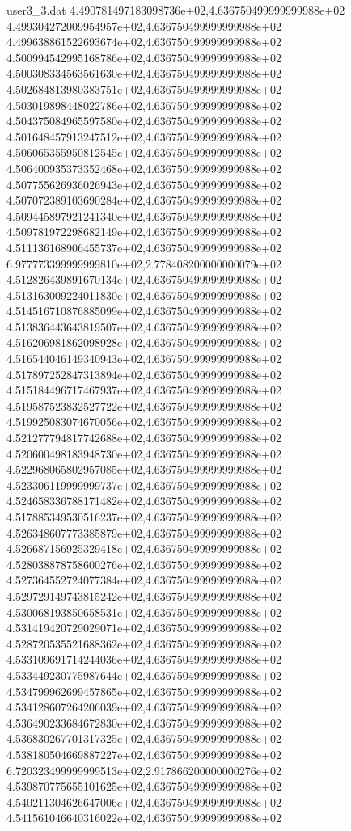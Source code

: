 \begin{filecontents}{user3_3.dat}
4.490781497183098736e+02,4.636750499999999988e+02
4.499304272009954957e+02,4.636750499999999988e+02
4.499638861522693674e+02,4.636750499999999988e+02
4.500994542995168786e+02,4.636750499999999988e+02
4.500308334563561630e+02,4.636750499999999988e+02
4.502684813980383751e+02,4.636750499999999988e+02
4.503019898448022786e+02,4.636750499999999988e+02
4.504375084965597580e+02,4.636750499999999988e+02
4.501648457913247512e+02,4.636750499999999988e+02
4.506065355950812545e+02,4.636750499999999988e+02
4.506400935373352468e+02,4.636750499999999988e+02
4.507755626936026943e+02,4.636750499999999988e+02
4.507072389103690284e+02,4.636750499999999988e+02
4.509445897921241340e+02,4.636750499999999988e+02
4.509781972298682149e+02,4.636750499999999988e+02
4.511136168906455737e+02,4.636750499999999988e+02
6.977773399999999810e+02,2.778408200000000079e+02
4.512826439891670134e+02,4.636750499999999988e+02
4.513163009224011830e+02,4.636750499999999988e+02
4.514516710876885099e+02,4.636750499999999988e+02
4.513836443643819507e+02,4.636750499999999988e+02
4.516206981862098928e+02,4.636750499999999988e+02
4.516544046149340943e+02,4.636750499999999988e+02
4.517897252847313894e+02,4.636750499999999988e+02
4.515184496717467937e+02,4.636750499999999988e+02
4.519587523832527722e+02,4.636750499999999988e+02
4.519925083074670056e+02,4.636750499999999988e+02
4.521277794817742688e+02,4.636750499999999988e+02
4.520600498183948730e+02,4.636750499999999988e+02
4.522968065802957085e+02,4.636750499999999988e+02
4.523306119999999737e+02,4.636750499999999988e+02
4.524658336788171482e+02,4.636750499999999988e+02
4.517885349530516237e+02,4.636750499999999988e+02
4.526348607773385879e+02,4.636750499999999988e+02
4.526687156925329418e+02,4.636750499999999988e+02
4.528038878758600276e+02,4.636750499999999988e+02
4.527364552724077384e+02,4.636750499999999988e+02
4.529729149743815242e+02,4.636750499999999988e+02
4.530068193850658531e+02,4.636750499999999988e+02
4.531419420729029071e+02,4.636750499999999988e+02
4.528720535521688362e+02,4.636750499999999988e+02
4.533109691714244036e+02,4.636750499999999988e+02
4.533449230775987644e+02,4.636750499999999988e+02
4.534799962699457865e+02,4.636750499999999988e+02
4.534128607264206039e+02,4.636750499999999988e+02
4.536490233684672830e+02,4.636750499999999988e+02
4.536830267701317325e+02,4.636750499999999988e+02
4.538180504669887227e+02,4.636750499999999988e+02
6.720323499999999513e+02,2.917866200000000276e+02
4.539870775655101625e+02,4.636750499999999988e+02
4.540211304626647006e+02,4.636750499999999988e+02
4.541561046640316022e+02,4.636750499999999988e+02

\end{filecontents}
